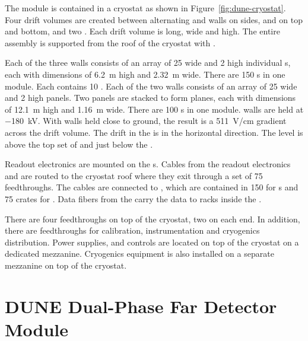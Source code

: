 The module is contained in a cryostat as shown in
Figure~\ref{fig:dune-cryostat}.  Four drift volumes are created
between alternating  and  walls on sides,
 and  on top and bottom, and two .
Each drift volume is \sptpclen long, \spmaxdrift wide and \tpcheight
high.  The entire assembly is supported from the roof of the cryostat
with .

Each of the three  walls consists of an array of \num{25}
wide and \num{2} high individual s, each with dimensions of
\SI{6.2}{\meter} high and \SI{2.32}{\meter} wide. There are \num{150}
s in one module. Each  contains \num{10}
. Each of the two  walls consists of an array of
\num{25} wide and \num{2} high  panels. Two panels are
stacked to form planes, each with dimensions of \SI{12.1}{\meter} high
and \SI{1.16}{\meter} wide. There are \num{100} s in one
module.   walls are held at $-$\SI{180}{\kilo\volt}. With
 walls held close to ground, the result is a
\SI{511}{\volt/\centi\meter} gradient across the drift volume. The
drift in the  is in the horizontal direction. The
 level is above the top set of  and just below
the .

Readout electronics are mounted on the s. Cables from the
readout electronics and  are routed to the cryostat roof
where they exit through a set of \num{75} feedthroughs. The cables are
connected to , which are contained in \num{150}
 for s and \num{75} crates for . Data
fibers from the  carry the data to  racks
inside the .

There are four  feedthroughs on top of the cryostat, two on
each end. In addition, there are feedthroughs for calibration,
instrumentation and cryogenics distribution. Power supplies, and
controls are located on top of the cryostat on a dedicated
mezzanine. Cryogenics equipment is also installed on a separate
mezzanine on top of the cryostat.

\section{DUNE Dual-Phase Far Detector Module}
\label{sec:fdsp-DP-module}

